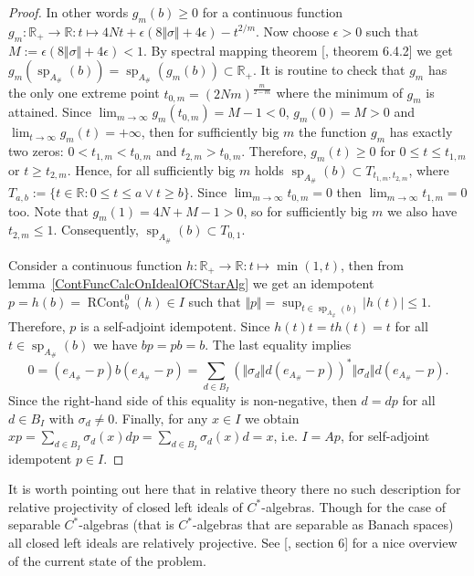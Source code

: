 \begin{proof}
In other words $g_m(b)\geq 0$ for a continuous function
$g_m:\mathbb{R}_+\to\mathbb{R}:t\mapsto
4Nt+\epsilon(8\Vert\sigma\Vert+4\epsilon)-t^{2/m}$. Now choose $\epsilon>0$ such
that $M:=\epsilon(8\Vert\sigma\Vert+4\epsilon)<1$.  By spectral mapping theorem
[\cite{HelLectAndExOnFuncAn}, theorem 6.4.2] we get
$g_m(\operatorname{sp}_{A_\#}(b))
=\operatorname{sp}_{A_\#}(g_m(b))\subset\mathbb{R}_+$.
It is routine to check that $g_m$ has the only one extreme point
$t_{0,m}={(2Nm)}^{\frac{m}{2-m}}$ where the minimum of $g_m$ is attained. Since
$\lim_{m\to\infty} g_m(t_{0,m})=M-1<0$, $g_m(0)=M>0$ and $\lim_{t\to\infty}
g_m(t)=+\infty$, then for sufficiently big $m$ the function $g_m$ has exactly
two zeros: $0<t_{1,m}<t_{0,m}$ and $t_{2,m} > t_{0,m}$. Therefore, $g_m(t)\geq 0$
for $0\leq t\leq t_{1,m}$ or $t\geq t_{2,m}$. Hence, for all sufficiently big
$m$ holds $\operatorname{sp}_{A_\#}(b)\subset T_{t_{1,m},t_{2,m}}$, 
where $T_{a, b}:=\{t\in\mathbb{R} : 0\leq t \leq a \vee t \geq b\}$. 
Since $\lim_{m\to\infty} t_{0,m}=0$ then $\lim_{m\to\infty} t_{1,m}=0$ too. 
Note that $g_m(1)=4N+M-1>0$, so for sufficiently big $m$ we also 
have $t_{2,m}\leq 1$. Consequently,
$\operatorname{sp}_{A_\#}(b)\subset T_{0,1}$.

Consider a continuous function $h:\mathbb{R}_+\to\mathbb{R}:t\mapsto\min(1, t)$,
then from lemma~\ref{ContFuncCalcOnIdealOfCStarAlg} we get an idempotent
$p=h(b)=\operatorname{RCont}_b^0(h)\in I$ such that $\Vert
p\Vert=\sup_{t\in\operatorname{sp}_{A_\#}(b)}|h(t)|\leq 1$. Therefore, $p$ is a
self-adjoint idempotent. Since $h(t)t=th(t)=t$ for all $t\in
\operatorname{sp}_{A_\#}(b)$ we have $bp=pb=b$. The last equality implies
$$
0=(e_{A_\#}-p)b(e_{A_\#}-p)
=\sum_{d\in B_I}
    {(\Vert\sigma_d\Vert d(e_{A_\#}-p))}^*\Vert\sigma_d\Vert d(e_{A_\#}-p).
$$
Since the right-hand side of this equality is non-negative, then $d=dp$ for all
$d\in B_I$ with $\sigma_d\neq 0$. Finally, for any $x\in I$ we obtain
$xp=\sum_{d\in B_I}\sigma_d(x)dp=\sum_{d\in B_I}\sigma_d(x)d=x$, i.e. $I=Ap$,
for self-adjoint idempotent $p\in I$.
\end{proof}

It is worth pointing out here that in relative theory there no such description
for relative projectivity of closed left ideals of $C^*$-algebras. Though for the case
of separable $C^*$-algebras (that is $C^*$-algebras that are separable as Banach
spaces) all closed left ideals are relatively projective. See
[\cite{LykProjOfBanAndCStarAlgsOfContFld}, section 6] for a nice overview of the
current state of the problem.

